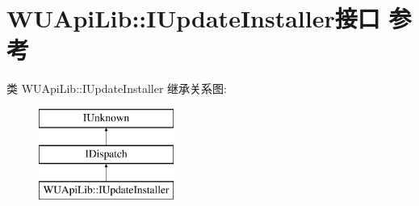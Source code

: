 \hypertarget{interface_w_u_api_lib_1_1_i_update_installer}{}\section{W\+U\+Api\+Lib\+:\+:I\+Update\+Installer接口 参考}
\label{interface_w_u_api_lib_1_1_i_update_installer}
类 W\+U\+Api\+Lib\+:\+:I\+Update\+Installer 继承关系图\+:\begin{figure}[H]
\begin{center}
\leavevmode
\includegraphics[height=3.000000cm]{interface_w_u_api_lib_1_1_i_update_installer}
\end{center}
\end{figure}
